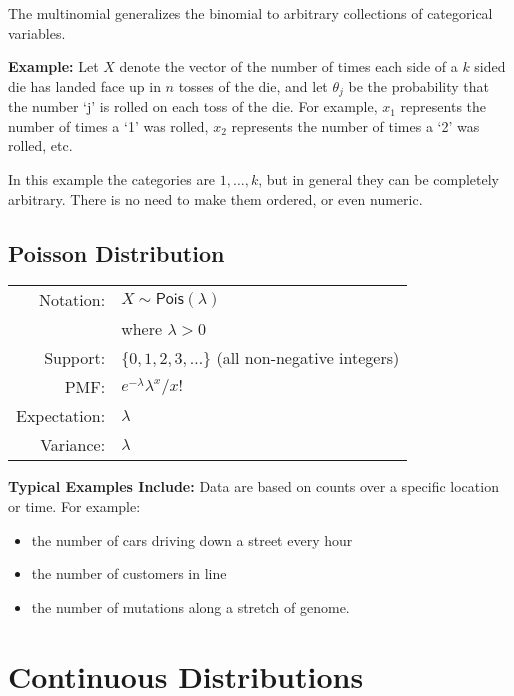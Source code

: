 \documentclass[twoside]{article}
\def\Pois{\textsf{Pois}} %
\begin{document}
The multinomial generalizes the binomial to arbitrary collections of categorical variables. 

{\bf Example:} Let $X$ denote the vector of the number of times each side of a $k$ sided die has landed face up in $n$ tosses of the die, and let $\theta_j$ be the probability that the number `j' is rolled on each toss of the die.
For example, $x_1$ represents the number of times a `1' was rolled, $x_2$ represents the number of times a `2' was rolled, etc.

In this example the categories are $1,\ldots,k$, but in general they can be completely arbitrary. There is no need to make them ordered, or even numeric.

\subsection*{Poisson  Distribution}
\begin{flushleft}
\def\arraystretch{1.1}
\begin{tabular}{rl}
Notation: & $X\sim \Pois(\lambda)$\\
& where $\lambda > 0$\\
Support:  & $\{0,1,2,3,\ldots\}$ (all non-negative integers)\\ 
PMF:   & $e^{-\lambda}\lambda^x/x!$\\ 
Expectation:  & $\lambda$\\
Variance:  &  $\lambda$
\end{tabular}
\end{flushleft}

{\bf Typical Examples Include:} Data are based on counts over a specific location or time. For example: 
\begin{itemize}
\item the number of cars driving down a street every hour
\item the number of customers in line 
\item the number of mutations along a stretch of genome.
\end{itemize}

\section*{Continuous Distributions}
\end{document}
